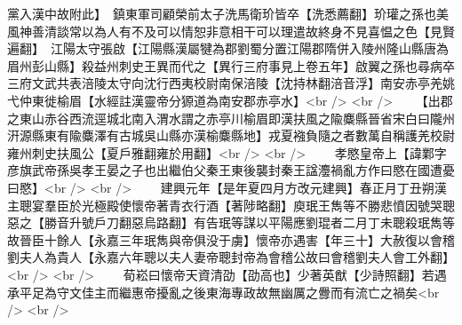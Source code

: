 黨入漢中故附此】　鎮東軍司顧榮前太子洗馬衛玠皆卒【洗悉薦翻】玠瓘之孫也美風神善清談常以為人有不及可以情恕非意相干可以理遣故終身不見喜愠之色【見賢遍翻】　江陽太守張啟【江陽縣漢屬犍為郡劉蜀分置江陽郡隋併入陵州隆山縣唐為眉州彭山縣】殺益州刺史王異而代之【異行三府事見上卷五年】啟翼之孫也尋病卒三府文武共表涪陵太守向沈行西夷校尉南保涪陵【沈持林翻涪音浮】南安赤亭羌姚弋仲東徙榆眉【水經註漢靈帝分獂道為南安郡赤亭水】<br />
<br />
　　【出郡之東山赤谷西流逕城北南入渭水謂之赤亭川榆眉即漢扶風之隃麋縣晉省宋白曰隴州汧源縣東有隃麋澤有古城吳山縣亦漢榆麋縣地】戎夏襁負隨之者數萬自稱護羌校尉雍州刺史扶風公【夏戶雅翻雍於用翻】<br />
<br />
　　孝愍皇帝上【諱鄴字彦旗武帝孫吳孝王晏之子也出繼伯父秦王東後襲封秦王諡灋禍亂方作曰愍在國遭憂曰愍】<br />
<br />
　　建興元年【是年夏四月方改元建興】春正月丁丑朔漢主聰宴羣臣於光極殿使懷帝著青衣行酒【著陟略翻】庾珉王雋等不勝悲憤因號哭聰惡之【勝音升號戶刀翻惡烏路翻】有告珉等謀以平陽應劉琨者二月丁未聰殺珉雋等故晉臣十餘人【永嘉三年珉雋與帝俱没于虜】懷帝亦遇害【年三十】大赦復以會稽劉夫人為貴人【永嘉六年聰以夫人妻帝聰封帝為會稽公故曰會稽劉夫人會工外翻】<br />
<br />
　　荀崧曰懷帝天資清劭【劭高也】少著英猷【少詩照翻】若遇承平足為守文佳主而繼惠帝擾亂之後東海專政故無幽厲之釁而有流亡之禍矣<br />
<br />
